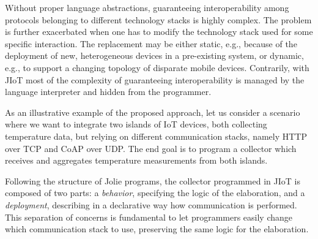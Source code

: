 Without proper language abstractions, guaranteeing interoperability among
protocols belonging to different technology stacks is highly complex. The
problem is further exacerbated when one has to modify the technology stack used
for some specific interaction. The replacement may be either static, e.g.,
because of the deployment of new, heterogeneous devices in a pre-existing
system, or dynamic, e.g., to support a changing topology of disparate mobile
devices. Contrarily, with JIoT most of the complexity of guaranteeing
interoperability is managed by the language interpreter and hidden from the
programmer.

As an illustrative example of the proposed approach, let us consider a scenario
where we want to integrate two islands of IoT devices, both collecting
temperature data, but relying on different communication stacks, namely HTTP
over TCP and CoAP over UDP.
%
The end goal is to program a collector which receives and aggregates
temperature measurements from both islands.

Following the structure of Jolie programs, the collector programmed in JIoT is
composed of two parts: a \emph{behavior}, specifying the logic of the
elaboration, and a \emph{deployment}, describing in a declarative way how
communication is performed. This separation of concerns is fundamental to let
programmers easily change which communication stack to use, preserving the same
logic for the elaboration.

